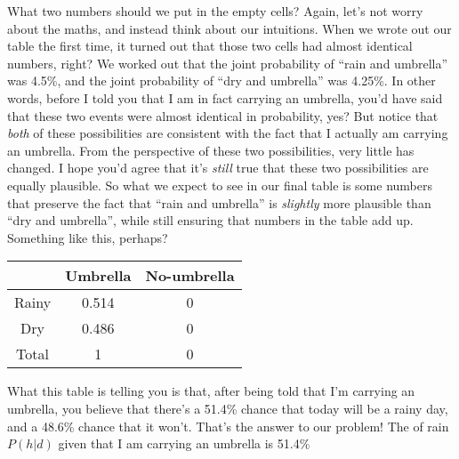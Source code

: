 What two numbers should we put in the empty cells? Again, let's not worry about the maths, and instead think about our intuitions. When we wrote out our table the first time, it turned out that those two cells had almost identical numbers, right? We worked out that the joint probability of ``rain and umbrella'' was 4.5\%, and the joint probability of ``dry and umbrella'' was 4.25\%. In other words, before I told you that I am in fact carrying an umbrella, you'd have said that these two events were almost identical in probability, yes? But notice that {\it both} of these possibilities are consistent with the fact that I actually am carrying an umbrella. From the perspective of these two possibilities, very little has changed. I hope you'd agree that it's {\it still} true that these two possibilities are equally plausible. So what we expect to see in our final table is some numbers that preserve the fact that ``rain and umbrella'' is {\it slightly} more plausible than ``dry and umbrella'', while still ensuring that numbers in the table add up. Something like this, perhaps?
\begin{center}
\begin{tabular}{c|cc}
& Umbrella & No-umbrella  \\ \hline
Rainy & 0.514 & 0   \\
Dry & 0.486 & 0    \\ \hline
Total & 1 & 0 
\end{tabular}
\end{center}
What this table is telling you is that, after being told that I'm carrying an umbrella, you believe that there's a 51.4\% chance that today will be a rainy day, and a 48.6\% chance that it won't. That's the answer to our problem! The  of rain $P(h|d)$ given that I am carrying an umbrella is 51.4\%

